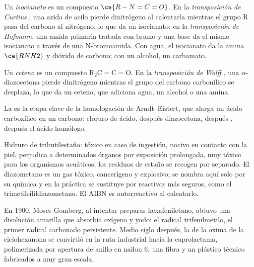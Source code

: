 \begin{definition}\label{def:b3:radicals-carbenes:curtius}
Un \emph{isocianato} es un compuesto $\ce{R-N=C=O}$. En la \emph{transposición de Curtius}%
, una azida de acilo pierde dinitrógeno al
calentarla mientras el grupo R pasa del carbono al nitrógeno, lo que da un isocianato;
en la \emph{transposición de Hofmann}, una amida primaria
tratada con bromo y una base da el mismo isocianato a través de una
N-bromoamida. Con agua, el isocianato da la amina $\ce{RNH2}$ y dióxido de
carbono; con un alcohol, un carbamato.
\end{definition}

\begin{definition}\label{def:b3:radicals-carbenes:wolff}
Un \emph{ceteno} es un compuesto $\mathrm{R_2C{=}C{=}O}$. En la \emph{transposición de Wolff}%
, una $\alpha$-diazocetona pierde dinitrógeno
mientras el grupo del carbono carbonílico se desplaza, lo que da un ceteno, que adiciona
agua, un alcohol o una amina.
\end{definition}

La  es la etapa clave de la homologación de Arndt--Eistert,
que alarga un ácido carboxílico en un carbono: cloruro de ácido, después
diazocetona, después , después el ácido homólogo.

\begin{safety}{}
Hidruro de tributilestaño: tóxico en caso de ingestión, nocivo en contacto con la piel, perjudica a determinados órganos
por exposición prolongada, muy tóxico para los organismos acuáticos; los residuos de estaño se recogen
por separado. El diazometano es un gas tóxico, cancerígeno y explosivo; se
nombra aquí solo por su química y en la práctica se sustituye por reactivos más seguros,
como el trimetilsilildiazometano. El AIBN es autorreactivo al calentarlo.
\end{safety}

\begin{history}
En 1900, Moses Gomberg, al intentar preparar hexafeniletano, obtuvo una disolución
amarilla que absorbía oxígeno y yodo: el radical trifenilmetilo, el primer
radical carbonado persistente. Medio siglo después, la  de la
oxima de la ciclohexanona se convirtió en la ruta industrial hacia la caprolactama, polimerizada por
apertura de anillo en nailon 6, una fibra y un plástico técnico fabricados a muy gran
escala.
\end{history}

